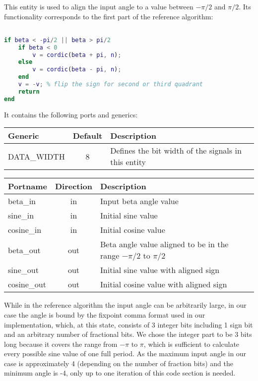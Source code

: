 This entity is used to align the input angle to a value between \(-\pi/2\) and \(\pi/2\). Its functionality corresponds to the first part of the reference algorithm:

\begin{lstlisting}[language=Matlab]

if beta < -pi/2 || beta > pi/2
	if beta < 0
		v = cordic(beta + pi, n);
	else
		v = cordic(beta - pi, n);
	end
	v = -v; % flip the sign for second or third quadrant
	return
end

\end{lstlisting}

It contains the following ports and generics: 

\begin{center}
	\begin{tabular}{ | l | c | l | }
		\hline
		\textbf{Generic} & \textbf{Default} & \textbf{Description} \\
		\hline
		DATA\_WIDTH & 8 & Defines the bit width of the signals in this entity \\
		\hline
	\end{tabular} 
\end{center}

\begin{center}
	\begin{tabular}{ | l | c | l | }
		\hline
		\textbf{Portname} & \textbf{Direction} & \textbf{Description} \\
		\hline
		beta\_in & in & Input beta angle value \\
		sine\_in & in  & Initial sine value \\
		cosine\_in & in  & Initial cosine value \\
		beta\_out & out  & Beta angle value aligned to be in the range \(-\pi/2\) to \(\pi/2\) \\
		sine\_out & out  & Initial sine value with aligned sign \\
		cosine\_out & out  & Initial cosine value with aligned sign \\
		\hline
	\end{tabular} 
\end{center}

While in the reference algorithm the input angle can be arbitrarily large, in our case the angle is bound by the fixpoint comma format used in our implementation, which, at this state, consists of 3 integer bits including 1 sign bit and an arbitrary number of fractional bits. We chose the integer part to be 3 bits long because it covers the range from \(-\pi\) to \(\pi\), which is sufficient to calculate every possible sine value of one full period. As the maximum input angle in our case is approximately 4 (depending on the number of fraction bits) and the minimum angle is -4, only up to one iteration of this code section is needed.


